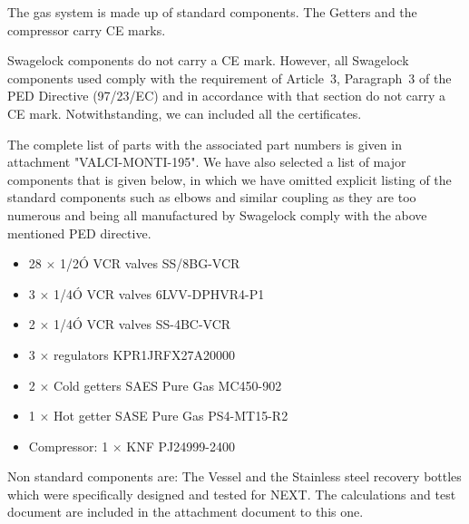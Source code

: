 The gas system is made up of standard components. The Getters and the compressor carry CE marks.

Swagelock components do not carry a CE mark. However, all Swagelock
components used comply with the requirement of Article~3, Paragraph~3 of the PED Directive \mbox{(97/23/EC)} and in accordance with that section do not carry a CE mark. Notwithstanding, we can included all the certificates.

The complete list of parts with the associated part numbers is given in attachment "VALCI-MONTI-195". We have also selected a list of major components that is given below, in which we have omitted explicit listing of the standard components such as elbows and similar coupling as they are too numerous and being all manufactured by Swagelock comply with the above mentioned PED directive.


%
\begin{itemize}

\item  28 $\times$ 1/2Ó VCR valves SS/8BG-VCR
\item  3 $\times$ 1/4Ó VCR valves 6LVV-DPHVR4-P1
\item  2 $\times$ 1/4Ó VCR valves SS-4BC-VCR
\item  3 $\times$ regulators KPR1JRFX27A20000

\item  2 $\times$  Cold getters SAES Pure Gas MC450-902
\item  1 $\times$  Hot getter SASE Pure Gas PS4-MT15-R2

\item  Compressor: 1 $\times$ KNF PJ24999-2400
\end{itemize}


Non standard components are:
The Vessel and the Stainless steel recovery bottles which were specifically designed and tested for NEXT. The calculations and test document are included in the attachment document to this one.




%

